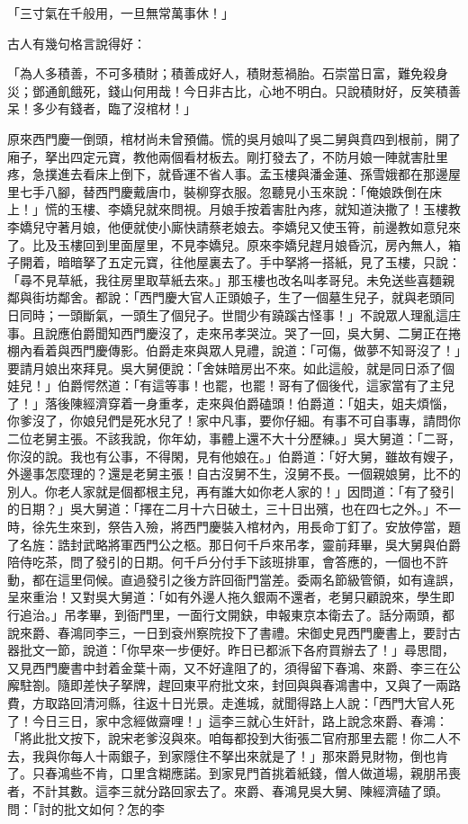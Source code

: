 「三寸氣在千般用，一旦無常萬事休！」

古人有幾句格言說得好：

「為人多積善，不可多積財；積善成好人，積財惹禍胎。石崇當日富，難免殺身災；鄧通飢餓死，錢山何用哉！今日非古比，心地不明白。只說積財好，反笑積善呆！多少有錢者，臨了沒棺材！」

原來西門慶一倒頭，棺材尚未曾預備。慌的吳月娘叫了吳二舅與賁四到根前，開了廂子，拏出四定元寶，教他兩個看材板去。剛打發去了，不防月娘一陣就害肚里疼，急撲進去看床上倒下，就昏運不省人事。孟玉樓與潘金蓮、孫雪娥都在那邊屋里七手八腳，替西門慶戴唐巾，裝柳穿衣服。忽聽見小玉來說：「俺娘跌倒在床上！」慌的玉樓、李嬌兒就來問視。月娘手按着害肚內疼，就知道決撒了！玉樓教李嬌兒守著月娘，他便就使小廝快請蔡老娘去。李嬌兒又使玉筲，前邊教如意兒來了。比及玉樓回到里面屋里，不見李嬌兒。原來李嬌兒趕月娘昏沉，房內無人，箱子開着，暗暗拏了五定元寶，往他屋裏去了。手中拏將一搭紙，見了玉樓，只說：「尋不見草紙，我往房里取草紙去來。」那玉樓也改名叫孝哥兒。未免送些喜麵親鄰與街坊鄰舍。都說：「西門慶大官人正頭娘子，生了一個墓生兒子，就與老頭同日同時；一頭斷氣，一頭生了個兒子。世間少有蹺蹊古怪事！」不說眾人理亂這庄事。且說應伯爵聞知西門慶沒了，走來吊孝哭泣。哭了一回，吳大舅、二舅正在捲棚內看着與西門慶傳影。伯爵走來與眾人見禮，說道：「可傷，做夢不知哥沒了！」要請月娘出來拜見。吳大舅便說：「舍妹暗房出不來。如此這般，就是同日添了個娃兒！」伯爵愕然道：「有這等事！也罷，也罷！哥有了個後代，這家當有了主兒了！」落後陳經濟穿着一身重孝，走來與伯爵磕頭！伯爵道：「姐夫，姐夫煩惱，你爹沒了，你娘兒們是死水兒了！家中凡事，要你仔細。有事不可自事專，請問你二位老舅主張。不該我說，你年幼，事體上還不大十分歷練。」吳大舅道：「二哥，你沒的說。我也有公事，不得閑，見有他娘在。」伯爵道：「好大舅，雖故有嫂子，外邊事怎麼理的？還是老舅主張！自古沒舅不生，沒舅不長。一個親娘舅，比不的別人。你老人家就是個都根主兒，再有誰大如你老人家的！」因問道：「有了發引的日期？」吳大舅道：「擇在二月十六日破土，三十日出殯，也在四七之外。」不一時，徐先生來到，祭告入殮，將西門慶裝入棺材內，用長命丁釘了。安放停當，題了名旌：誥封武略將軍西門公之柩。那日何千戶來吊孝，靈前拜畢，吳大舅與伯爵陪侍吃茶，問了發引的日期。何千戶分付手下該班排軍，會答應的，一個也不許動，都在這里伺候。直過發引之後方許回衙門當差。委兩名節級管領，如有違誤，呈來重治！又對吳大舅道：「如有外邊人拖久銀兩不還者，老舅只顧說來，學生即行追治。」吊孝畢，到衙門里，一面行文開鈌，申報東京本衛去了。話分兩頭，都說來爵、春鴻同李三，一日到袞州察院投下了書禮。宋御史見西門慶書上，要討古器批文一節，說道：「你早來一步便好。昨日已都派下各府買辦去了！」尋思間，又見西門慶書中封着金葉十兩，又不好違阻了的，須得留下春鴻、來爵、李三在公廨駐劄。隨即差快子拏牌，趕回東平府批文來，封回與與春鴻書中，又與了一兩路費，方取路回清河縣，往返十日光景。走進城，就聞得路上人說：「西門大官人死了！今日三日，家中念經做齋哩！」這李三就心生奸計，路上說念來爵、春鴻：「將此批文按下，說宋老爹沒與來。咱每都投到大街張二官府那里去罷！你二人不去，我與你每人十兩銀子，到家隱住不拏出來就是了！」那來爵見財物，倒也肯了。只春鴻些不肯，口里含糊應諾。到家見門首挑着紙錢，僧人做道場，親朋吊喪者，不計其數。這李三就分路回家去了。來爵、春鴻見吳大舅、陳經濟磕了頭。問：「討的批文如何？怎的李